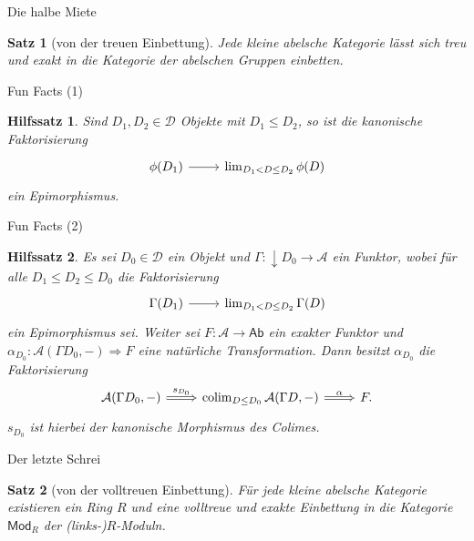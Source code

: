 \documentclass[usenames, dvipsnames]{beamer}
\newtheorem{hilfssatz}{Hilfssatz}
\newtheorem{satz}{Satz}
\newcommand\ccat\mathsf
\newcommand\cat\mathcal
\newcommand{\down}[1]{{\downarrow}#1}
\newcommand{\n}{\pgfmatrixnextcell}
\newcommand\nat\Rightarrow
\DeclareMathOperator{\colim}{colim}
\begin{document}
	\begin{frame}{Die halbe Miete}
		\begin{satz}[von der treuen Einbettung]\label{abeb}
			Jede kleine abelsche Kategorie lässt sich treu und exakt in die Kategorie
			der abelschen Gruppen einbetten.
		\end{satz}
	\end{frame}
	\begin{frame}{Fun Facts (1)}
		\begin{hilfssatz}
			Sind $D_1, D_2\in\cat{D}$ Objekte mit $D_1\leq D_2$, so ist die kanonische Faktorisierung
			\[
				\begin{tikzcd}
					\phi(D_1) \arrow[r] \n \lim_{D_1<D\leq D_2}\phi(D)
				\end{tikzcd}
			\]
			ein Epimorphismus.
		\end{hilfssatz}
	\end{frame}
	\begin{frame}{Fun Facts (2)}
		\begin{hilfssatz}
			Es sei $D_0\in\cat{D}$ ein Objekt und $\Gamma\colon \down{D_0}\to\cat{A}$
			ein Funktor, wobei für alle $D_1\leq D_2\leq D_0$ die Faktorisierung
			\[
				\begin{tikzcd}
					\Gamma(D_1) \arrow[r] \n \lim_{D_1<D\leq D_2} \Gamma(D)
				\end{tikzcd}
			\]
			ein Epimorphismus sei. Weiter sei $F\colon\cat{A}\to\ccat{Ab}$ ein exakter
			Funktor und $\alpha_{D_0}\colon \cat{A}(\Gamma D_0, {-})\nat F$
			eine natürliche Transformation. Dann besitzt $\alpha_{D_0}$ die
			Faktorisierung
			\[
				\begin{tikzcd}
					\cat{A}(\Gamma D_0, {-}) \arrow[Rightarrow]{r}{s_{D_0}} \n \colim_{D\leq D_0}\cat{A}(\Gamma D, {-}) \arrow[Rightarrow]{r}{\alpha} \n F.
				\end{tikzcd}
			\]
			$s_{D_0}$ ist hierbei der kanonische Morphismus des Colimes.
		\end{hilfssatz}
	\end{frame}
	\begin{frame}{Der letzte Schrei}
		\begin{satz}[von der volltreuen Einbettung]
			Für jede kleine abelsche Kategorie existieren ein Ring $R$ und eine volltreue
			und exakte Einbettung in die Kategorie $\ccat{Mod}_R$ der (links-)$R$-Moduln.
		\end{satz}
	\end{frame}
\end{document}
